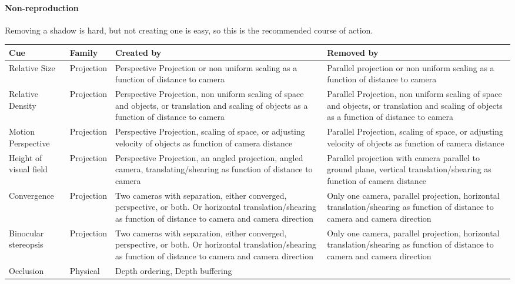 \paragraph{Non-reproduction}
Removing a shadow is hard, but not creating one is easy, so this is the recommended course of action.

\begin{table*}[p]
\begin{center}
\small
\begin{tabular}{p{2cm}|p{1.9cm}|p{5cm}|p{5cm}}
Cue & Family & Created by & Removed by \\
\hline
Relative Size &
Projection &
Perspective Projection or non uniform scaling as a function of distance to camera &
Parallel projection or non uniform scaling as a function of distance to camera \\
Relative Density &
Projection &
Perspective Projection, non uniform scaling of space and objects, or translation and scaling of objects as a function of distance to camera &
Parallel Projection, non uniform scaling of space and objects, or translation and scaling of objects as a function of distance to camera \\
Motion Perspective &
Projection &
Perspective Projection, scaling of space, or adjusting velocity of objects as function of camera distance &
Parallel Projection, scaling of space, or adjusting velocity of objects as function of camera distance \\
Height of visual field &
Projection &
Perspective Projection, an angled projection, angled camera, translating/shearing as function of distance to camera &
Parallel projection with camera parallel to ground plane, vertical translation/shearing as function of camera distance \\
Convergence &
Projection &
Two cameras with separation, either converged, perspective, or both. Or horizontal translation/shearing as function of distance to camera and camera direction &
Only one camera, parallel projection, horizontal translation/shearing as function of distance to camera and camera direction \\
Binocular stereopsis &
Projection &
Two cameras with separation, either converged, perspective, or both. Or horizontal translation/shearing as function of distance to camera and camera direction &
Only one camera, parallel projection, horizontal translation/shearing as function of distance to camera and camera direction \\
Occlusion &
Physical &
Depth ordering, Depth buffering &

\end{tabular}
\end{center}
\end{table*}
